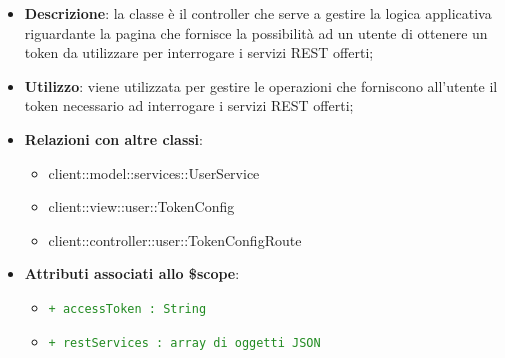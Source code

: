 			\begin{itemize}
				\item \textbf{Descrizione}: la classe è il controller che serve a gestire la logica applicativa riguardante la pagina che fornisce la possibilità ad un utente di ottenere un token da utilizzare per interrogare i servizi REST offerti;
				\item \textbf{Utilizzo}: viene utilizzata per gestire le operazioni che forniscono all'utente il token necessario ad interrogare i servizi REST offerti;
				\item \textbf{Relazioni con altre classi}:
					\begin{itemize}
						\item client::model::services::UserService
						\item client::view::user::TokenConfig
						\item client::controller::user::TokenConfigRoute
					\end{itemize}

				\item \textbf{Attributi associati allo \$scope}:
					\begin{itemize}
						\item \textcolor{forestgreen}{\texttt{+ accessToken : String}}
						\item \textcolor{forestgreen}{\texttt{+ restServices : array di oggetti JSON}}
					\end{itemize}


\end{itemize}
